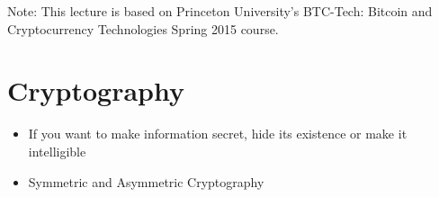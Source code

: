 \documentclass{article}
\begin{document}
\maketitle

Note: This lecture is based on Princeton University's BTC-Tech: Bitcoin and Cryptocurrency Technologies Spring 2015 course.

\section*{Cryptography}
\begin{itemize}
  \item If you want to make information secret, hide its existence or make it intelligible
  \item Symmetric and Asymmetric Cryptography
\end{itemize}
\end{document}
